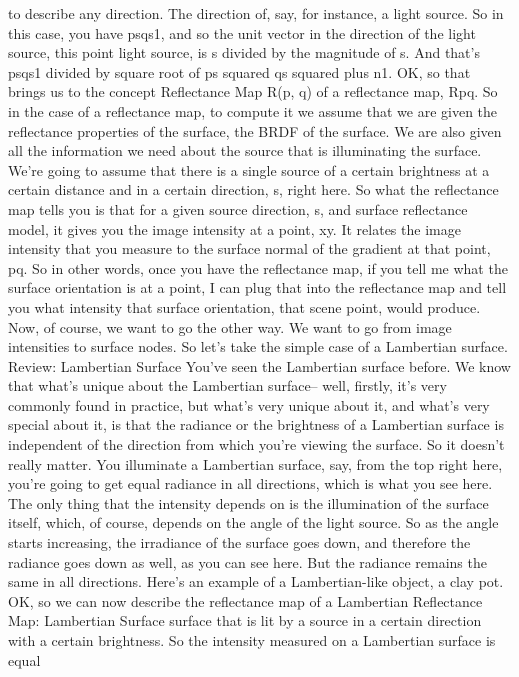 \documentclass[12pt]{article}
\begin{document}
to describe any direction.
The direction of, say, for instance, a light source.
So in this case, you have psqs1, and so the unit
vector in the direction of the light source, this point light
source, is s divided by the magnitude of s.
And that's psqs1 divided by square root of ps squared qs
squared plus n1.
OK, so that brings us to the concept
Reflectance Map R(p, q)
of a reflectance map, Rpq.
So in the case of a reflectance map, to compute it
we assume that we are given the reflectance properties
of the surface, the BRDF of the surface.
We are also given all the information
we need about the source that is illuminating the surface.
We're going to assume that there is
a single source of a certain brightness
at a certain distance and in a certain direction, s, right
here.
So what the reflectance map tells
you is that for a given source direction,
s, and surface reflectance model,
it gives you the image intensity at a point, xy.
It relates the image intensity that you
measure to the surface normal of the gradient at that point, pq.
So in other words, once you have the reflectance map,
if you tell me what the surface orientation is at a point,
I can plug that into the reflectance map
and tell you what intensity that surface orientation, that
scene point, would produce.
Now, of course, we want to go the other way.
We want to go from image intensities to surface nodes.
So let's take the simple case of a Lambertian surface.
Review: Lambertian Surface
You've seen the Lambertian surface before.
We know that what's unique about the Lambertian surface--
well, firstly, it's very commonly found in practice,
but what's very unique about it, and what's
very special about it, is that the radiance
or the brightness of a Lambertian surface
is independent of the direction from which you're
viewing the surface.
So it doesn't really matter.
You illuminate a Lambertian surface, say,
from the top right here, you're going
to get equal radiance in all directions, which
is what you see here.
The only thing that the intensity depends on
is the illumination of the surface itself,
which, of course, depends on the angle of the light source.
So as the angle starts increasing,
the irradiance of the surface goes down,
and therefore the radiance goes down as well,
as you can see here.
But the radiance remains the same in all directions.
Here's an example of a Lambertian-like object, a clay
pot.
OK, so we can now describe the reflectance map of a Lambertian
Reflectance Map: Lambertian Surface
surface that is lit by a source in a certain direction
with a certain brightness.
So the intensity measured on a Lambertian surface is equal
\end{document}
